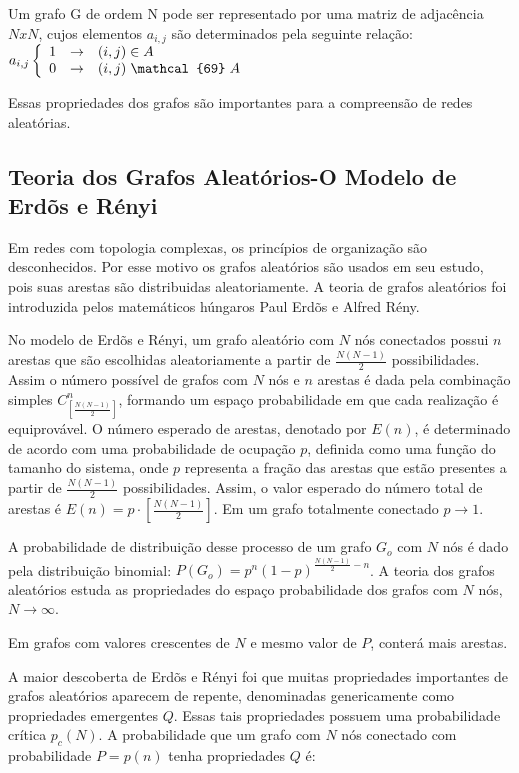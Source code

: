 \documentclass[brazil,ruledheader]{abnt}
\begin{document}
Um grafo G de ordem N pode ser representado por uma matriz de adjacência $NxN$,
cujos elementos $a_{i,j}$ são determinados pela seguinte relação:
$a_{i,j}\left\{  \begin{array}{rcl}
1 & \rightarrow & (i,j) \in A \\ 
0 & \rightarrow & (i,j) \mbox{\hspace{.3em}}\mathcal{69}\mbox{\hspace{.3em}} A 
\end{array}\right.$


Essas propriedades dos grafos são importantes para a compreensão de redes
aleatórias. 

\subsection{Teoria dos Grafos Aleatórios-O Modelo de Erdõs e Rényi}

Em redes com topologia complexas, os princípios de organização são
desconhecidos. Por esse motivo os grafos
aleatórios são usados em seu estudo, pois suas arestas são distribuidas
aleatoriamente. A teoria de
grafos aleatórios foi introduzida pelos matemáticos húngaros Paul Erdõs e Alfred
Rény.


No modelo de Erdõs e Rényi, um grafo aleatório com $N$ nós conectados possui
$n$ arestas que são escolhidas aleatoriamente a partir de $\frac{N(N-1)}{2}$
possibilidades.  Assim o número possível de grafos com $N$ nós e $n$ arestas é
dada pela combinação simples $C^n_{\left[\frac{N(N-1)}{2}\right]}$, formando um
espaço probabilidade em que cada realização é equiprovável. O número esperado de
arestas, denotado por $E(n)$, é determinado de acordo com uma probabilidade de
ocupação $p$, definida como uma função do tamanho do sistema, onde $p$
representa a fração das arestas que estão presentes a partir de
$\frac{N(N-1)}{2}$ possibilidades.  Assim, o valor esperado do número total de
arestas é $E(n)=p \cdot \left[ \frac{N(N-1)}{2} \right]$. Em um grafo totalmente
conectado $p\rightarrow 1$.

A probabilidade de distribuição desse processo de um grafo
$G_o$ com $N$ nós é dado pela distribuição binomial:   $P(G_o)
= p^n(1-p)^{\frac{N(N-1)}{2} - n}$. A teoria dos grafos aleatórios estuda as
propriedades do espaço probabilidade dos grafos com $N$ nós,  $N \rightarrow
\infty$.

Em grafos com valores crescentes de $N$ e mesmo valor de $P$, conterá mais
arestas.

A maior descoberta de Erdõs e Rényi foi que muitas propriedades importantes de
grafos aleatórios aparecem de repente, denominadas genericamente como
propriedades emergentes
$Q$. Essas tais propriedades possuem uma probabilidade crítica $p_c(N)$. A
probabilidade que um grafo com $N$ nós conectado com probabilidade $P=p(n)$
tenha propriedades $Q$ é:
\end{document}
